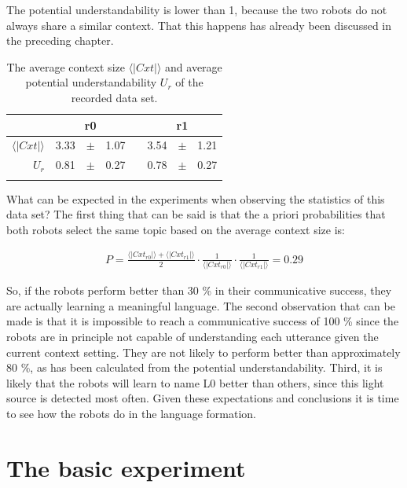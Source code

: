 The potential understandability is lower than 1, because the two robots do not always share a similar context. That this happens has already been discussed in the preceding chapter.

\begin{table}
\centering
\begin{tabular}{rd{3}@{~}c@{~}d{2}c@{~}d{3}@{~}c@{~}d{2}}
\lsptoprule
 &  & & \\\midrule
$\langle|Cxt|\rangle$ & 3.33 & $\pm$ & 1.07 & & 3.54 & $\pm$ & 1.21\\
$U_r$ & 0.81 & $\pm$ & 0.27 & & 0.78 & $\pm$ & 0.27\\
\lspbottomrule
\end{tabular}
\caption{The average context size $\langle|Cxt|\rangle$ and average potential understandability $U_r$ of the recorded data set.}
\label{t:st:data}
\end{table}


What can be expected in the experiments when observing the statistics of this data set? The first thing that can be said is that the a priori probabilities that both robots select the same topic based on the average context size is:

\begin{eqnarray*}
P=\frac{\langle|Cxt_{r0}|\rangle+\langle|Cxt_{r1}|\rangle}{2}\cdot \frac{1}{\langle|Cxt_{r0}|\rangle} \cdot \frac{1}{\langle|Cxt_{r1}|\rangle}=0.29
\end{eqnarray*}


So, if the robots perform better than 30 \% in their communicative success, they are actually learning a meaningful language. The second observation that can be made is that it is impossible to reach a communicative success of 100 \% since the robots are in principle not capable of understanding each utterance given the current context setting. They are not likely to perform better than approximately 80 \%, as has been calculated from the potential understandability. Third, it is likely that the robots will learn to name L0 better than others, since this light source is detected most often. Given these expectations and conclusions it is time to see how the robots do in the language formation.


\section{The basic experiment}\label{s:st:experiment}

